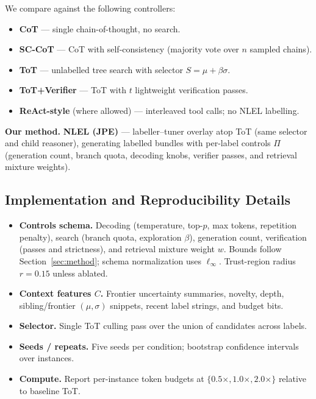 \documentclass{article}
\theoremstyle{plain}
\theoremstyle{definition}
\theoremstyle{remark}
\begin{document}
We compare against the following controllers:
\begin{itemize}\setlength{\itemsep}{0pt}
    \item \textbf{CoT} --- single chain-of-thought, no search.
    \item \textbf{SC-CoT} --- CoT with self-consistency (majority vote over $n$ sampled chains).
    \item \textbf{ToT} --- unlabelled tree search with selector $S=\mu+\beta\sigma$.
    \item \textbf{ToT+Verifier} --- ToT with $t$ lightweight verification passes.
    \item \textbf{ReAct-style} (where allowed) --- interleaved tool calls; no NLEL labelling.
\end{itemize}
\noindent\textbf{Our method.} \textbf{NLEL (JPE)} --- labeller--tuner overlay atop ToT (same selector and child reasoner), generating labelled bundles with per-label controls $\Pi$ (generation count, branch quota, decoding knobs, verifier passes, and retrieval mixture weights).

\subsection{Implementation and Reproducibility Details}

\begin{itemize}\setlength{\itemsep}{2pt}
    \item \textbf{Controls schema.} Decoding (temperature, top-$p$, max tokens, repetition penalty), search (branch quota, exploration $\beta$), generation count, verification (passes and strictness), and retrieval mixture weight $w$. Bounds follow Section~\ref{sec:method}; schema normalization uses $\ell_\infty$. Trust-region radius $r{=}0.15$ unless ablated.
    \item \textbf{Context features $C$.} Frontier uncertainty summaries, novelty, depth, sibling/frontier $(\mu,\sigma)$ snippets, recent label strings, and budget bits.
    \item \textbf{Selector.} Single ToT culling pass over the union of candidates across labels.
    \item \textbf{Seeds / repeats.} Five seeds per condition; bootstrap confidence intervals over instances.
    \item \textbf{Compute.} Report per-instance token budgets at $\{0.5\times,1.0\times,2.0\times\}$ relative to baseline ToT.
\end{itemize}
\end{document}

